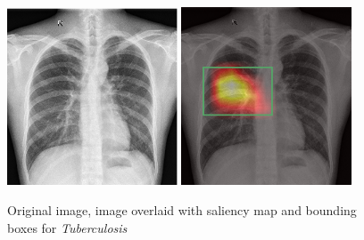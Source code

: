 \documentclass[8pt]{beamer}
\begin{document}
\begin{frame}
\begin{figure}[H]
  \centering
  \includegraphics[width=0.45\textwidth]{images/preds/TB}\hspace{0.01\textwidth}%
  \includegraphics[width=0.45\textwidth]{images/preds/TB_cam}\\[0.01\textwidth]
  \caption{Original image, image overlaid with saliency map and bounding boxes
    for \emph{Tuberculosis}}
  \label{examples_16}
\end{figure}
\end{frame}
\end{document}
